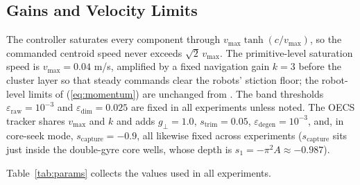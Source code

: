 \documentclass[lettersize,journal]{IEEEtran}
\begin{document}
\subsection{Gains and Velocity Limits}

The controller saturates every component through $v_{\max}\tanh(c /
v_{\max})$, so the commanded centroid speed never exceeds
$\sqrt{2}\,v_{\max}$. The primitive-level saturation speed is $v_{\max}
= 0.04$ m/s, amplified by a fixed navigation gain $k = 3$ before the
cluster layer so that steady commands clear the robots' stiction floor;
the robot-level limits of (\ref{eq:momentum}) are unchanged from \cite{14}.
The band thresholds $\varepsilon_{\text{raw}} = 10^{-3}$ and
$\varepsilon_{\text{dim}} = 0.025$ are fixed in all experiments unless
noted. The OECS tracker shares $v_{\max}$ and $k$ and adds $g_\perp =
1.0$, $s_{\text{trim}} = 0.05$, $\varepsilon_{\text{degen}} = 10^{-3}$,
and, in core-seek mode, $s_{\text{capture}} = -0.9$, all likewise fixed
across experiments ($s_{\text{capture}}$ sits just inside the
double-gyre core wells, whose depth is $s_1 = -\pi^2 A \approx
-0.987$).

Table~\ref{tab:params} collects the values used in all experiments.
\end{document}
